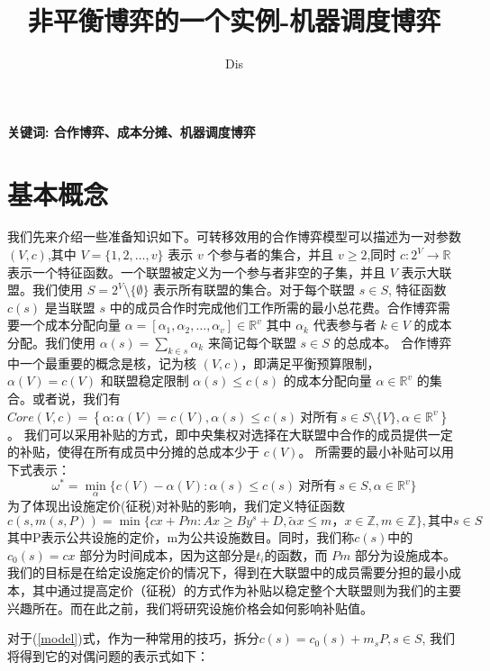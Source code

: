 \documentclass[UTF8]{article}
\author {Dis \cdot {count}}
\title {非平衡博弈的一个实例-机器调度博弈}
\date{}
\begin{document}
    \maketitle


\qquad \textbf{关键词: 合作博弈、成本分摊、机器调度博弈}

\section{基本概念}
我们先来介绍一些准备知识如下。可转移效用的合作博弈模型可以描述为一对参数 $(V,c)$,其中 $V=\{1,2,\dots,v\}$ 表示 $v$ 个参与者的集合，并且 $v\geq2$,同时
$c:2^{V}\to \mathbb{R}$ 表示一个特征函数。一个联盟被定义为一个参与者非空的子集，并且 $V$ 表示大联盟。我们使用 $S=2^{V} \setminus\{\emptyset\}$ 表示所有联盟的集合。对于每个联盟 $s\in S$, 特征函数 $c(s)$ 是当联盟 $s$ 中的成员合作时完成他们工作所需的最小总花费。合作博弈需要一个成本分配向量 $\alpha=[\alpha_{1},\alpha_{2},\dots,\alpha_{v}] \in \mathbb{R}^{v}$ 其中 $\alpha_{k}$ 代表参与者 $k \in V$ 的成本分配。我们使用 $\alpha(s)=\sum_{k\in{s}}\alpha_{k}$ 来简记每个联盟 $s\in S$ 的总成本。
合作博弈中一个最重要的概念是核，记为核 $(V,c)$，即满足平衡预算限制，$\alpha(V)=c(V)$ 和联盟稳定限制 $\alpha(s) \leq c(s)$ 的成本分配向量 $\alpha\in\mathbb{R}^{v}$ 的集合。或者说，我们有 $Core(V,c)= \left\{\alpha:\alpha(V)=c(V), \alpha(s)\leq c(s)\ \text{对所有}\ s \in S \setminus\{V\}, \alpha \in \mathbb{R}^{v} \right\}$。
我们可以采用补贴的方式，即中央集权对选择在大联盟中合作的成员提供一定的补贴，使得在所有成员中分摊的总成本少于 $c(V)$。
所需要的最小补贴可以用下式表示：
\begin{equation} \label{model}
  \omega^*=\mathop{\min}_{\alpha}\{c(V)-\alpha(V):\alpha(s)\leq c(s)\ \text{对所有}\ s \in S, \alpha\in\mathbb{R}^{v}\}
\end{equation}
为了体现出设施定价(征税)对补贴的影响，我们定义特征函数
\[
c(s,m(s,P))=\mathop{\min}\{cx+Pm:Ax \geq By^s+D, \tilde{\alpha}x \leq m，x \in \mathbb{Z} ,m \in \mathbb{Z}\} ,\text{其中} s \in S
\]
其中P表示公共设施的定价，m为公共设施数目。同时，我们称$c(s)$中的 $c_0(s) = cx$ 部分为时间成本，因为这部分是$t_i$的函数，而 $Pm$ 部分为设施成本。
我们的目标是在给定设施定价的情况下，得到在大联盟中的成员需要分担的最小成本，其中通过提高定价（征税）的方式作为补贴以稳定整个大联盟则为我们的主要兴趣所在。而在此之前，我们将研究设施价格会如何影响补贴值。

对于(\ref{model})式，作为一种常用的技巧，拆分$c(s)=c_0(s)+m_sP, s \in S$, 我们将得到它的对偶问题的表示式如下：
\end{document}
